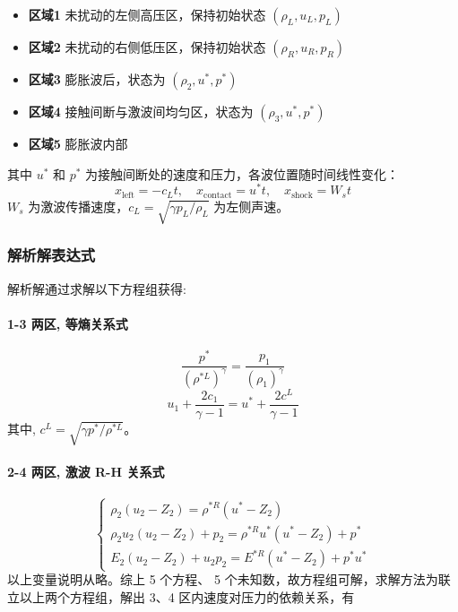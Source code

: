 \documentclass[UTF8]{ctexart}
\begin{document}
\begin{itemize}
    \item \textbf{区域1} 未扰动的左侧高压区，保持初始状态 $(\rho_L, u_L, p_L)$
    \item \textbf{区域2} 未扰动的右侧低压区，保持初始状态 $(\rho_R, u_R, p_R)$
    \item \textbf{区域3} 膨胀波后，状态为 $(\rho_2, u^*, p^*)$
    \item \textbf{区域4} 接触间断与激波间均匀区，状态为 $(\rho_3, u^*, p^*)$
    \item \textbf{区域5} 膨胀波内部
\end{itemize}

其中 $u^*$ 和 $p^*$ 为接触间断处的速度和压力，各波位置随时间线性变化：
$$x_{\text{left}} = -c_L t, \quad x_{\text{contact}} = u^* t, \quad x_{\text{shock}} = W_s t$$
$W_s$ 为激波传播速度，$c_L = \sqrt{\gamma p_L/\rho_L}$ 为左侧声速。

\subsubsection{解析解表达式}
解析解通过求解以下方程组获得:
\paragraph{1-3 两区, 等熵关系式}
\begin{equation}
    \frac{p^{*}}{\left(\rho^{* L}\right)^{\gamma}}=\frac{p_{1}}{\left(\rho_{1}\right)^{\gamma}}
\end{equation}
\begin{equation}
u_{1}+\frac{2 c_{1}}{\gamma-1}=u^{*}+\frac{2 c^{L}}{\gamma-1}
\end{equation}
其中, $c^{L}=\sqrt{\gamma p^{*} / \rho^{* L}}$。
\paragraph{2-4 两区, 激波 R-H 关系式}
\begin{equation}
\left\{\begin{array}{l}\rho_{2}\left(u_{2}-Z_{2}\right)=\rho^{* R}\left(u^{*}-Z_{2}\right) \\\rho_{2} u_{2}\left(u_{2}-Z_{2}\right)+p_{2}=\rho^{* R} u^{*}\left(u^{*}-Z_{2}\right)+p^{*} \\E_{2}\left(u_{2}-Z_{2}\right)+u_{2} p_{2}=E^{* R}\left(u^{*}-Z_{2}\right)+p^{*} u^{*}\end{array}\right.
\end{equation}
以上变量说明从略。综上 5 个方程、 5 个未知数，故方程组可解，求解方法为联立以上两个方程组，解出 3、4 区内速度对压力的依赖关系，有
\end{document}
